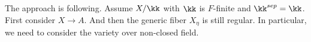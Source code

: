 The approach is following.
Assume $X/\kk$ with $\kk$ is $F$-finite and $\kk^{sep} = \kk$.
First consider $X \to A$.
And then the generic fiber $X_\eta$ is still regular.
In particular, we need to consider the variety over non-closed field.












